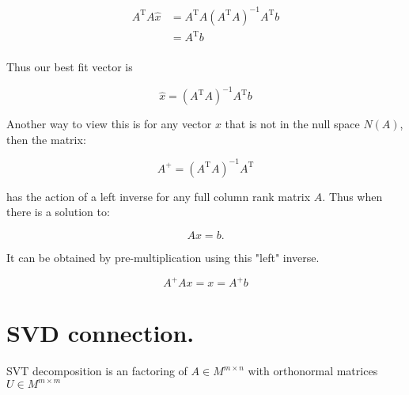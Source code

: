 \documentclass{article}      %
\newcommand{\T}[0]{\text{T}}
\begin{document}
\begin{align*}
A^\T A \hat{x} 
&= A^\T A (A^\T A)^{-1} A^\T b \\
&= A^\T b \\
\end{align*}

Thus our best fit vector is

\begin{equation}
\hat{x} 
= (A^\T A)^{-1} A^\T b
\end{equation}

Another way to view this is for any vector $x$ that is not in the null space $N(A)$, then the matrix:

\begin{equation}
A^{+}= (A^\T A)^{-1} A^\T
\end{equation}

has the action of a left inverse for any full column rank matrix $A$.  Thus when there is a solution to:

\begin{equation}
A x = b.
\end{equation}

It can be obtained by pre-multiplication using this "left" inverse.

\begin{equation}
A^{+} A x = x = A^{+} b
\end{equation}











































\section{ SVD connection. }


SVT decomposition is an factoring of $A \in M^{m \times n}$ with orthonormal matrices $U \in M^{m \times m}$
\end{document}
